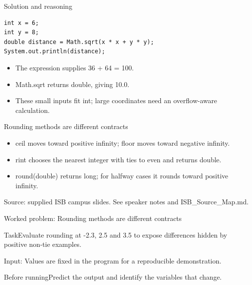 \documentclass[10pt,aspectratio=169]{beamer}
\begin{document}
\begin{frame}[fragile,t]{Solution and reasoning}
\begin{lstlisting}
int x = 6;
int y = 8;
double distance = Math.sqrt(x * x + y * y);
System.out.println(distance);
\end{lstlisting}\vspace{1mm}\small\begin{itemize}
\item The expression supplies 36 + 64 = 100.
\item Math.sqrt returns double, giving 10.0.
\item These small inputs fit int; large coordinates need an overflow-aware calculation.
\end{itemize}
\end{frame}

\begin{frame}[fragile,t]{Rounding methods are different contracts}
\begin{itemize}
\item ceil moves toward positive infinity; floor moves toward negative infinity.
\item rint chooses the nearest integer with ties to even and returns double.
\item round(double) returns long; for halfway cases it rounds toward positive infinity.
\end{itemize}
\vspace{3mm}\footnotesize\textcolor{accent}{Source: supplied ISB campus slides. See speaker notes and ISB\_Source\_Map.md.}
\end{frame}

\begin{frame}[fragile,t]{Worked problem: Rounding methods are different contracts}
\begin{block}{Task}Evaluate rounding at {-}2.3, 2.5 and 3.5 to expose differences hidden by positive non{-}tie examples.\end{block}
\small Input: Values are fixed in the program for a reproducible demonstration.\par\vspace{3mm}\begin{exampleblock}{Before running}Predict the output and identify the variables that change.\end{exampleblock}
\end{frame}
\end{document}
